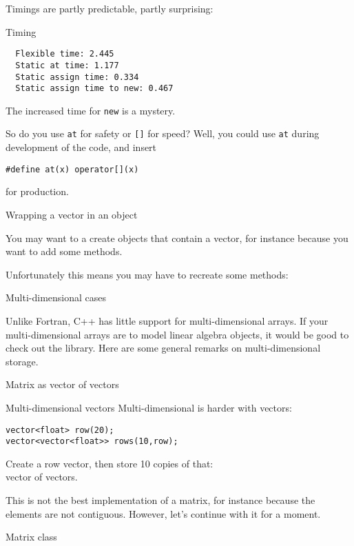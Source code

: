 Timings are partly predictable, partly surprising:
\begin{block}{Timing}
  \label{sl:vector-extend-time}
\begin{lstlisting}
  Flexible time: 2.445
  Static at time: 1.177
  Static assign time: 0.334
  Static assign time to new: 0.467
\end{lstlisting}
\end{block}

The increased time for \lstinline{new} is a mystery.

So do you use \lstinline{at} for safety or \lstinline{[]} for speed? Well, you could
use \lstinline{at} during development of the code, and insert
\begin{lstlisting}
#define at(x) operator[](x)
\end{lstlisting}
for production.

 {Wrapping a vector in an object}

You may want to a create objects that contain a vector, for instance
because you want to add some methods.
%

Unfortunately this means you may have to recreate some methods:
%

 {Multi-dimensional cases}

Unlike Fortran, C++ has little support for multi-dimensional
arrays. If your multi-dimensional arrays are to model linear algebra
objects, it would be good to check out the 
library. Here are some general remarks on multi-dimensional storage.

 {Matrix as vector of vectors}

\begin{block}{Multi-dimensional vectors}
  \label{sl:multi-vector}
  Multi-dimensional is harder with vectors:
\begin{lstlisting}
vector<float> row(20);
vector<vector<float>> rows(10,row);
\end{lstlisting}
Create a row vector, then store 10 copies of that:\\
vector of vectors.
\end{block}

This is not the best implementation of a matrix, for instance because
the elements are not contiguous. However, let's continue with it for a moment.

\begin{block}{Matrix class}
  \label{sl:matrix-class}
\end{block}

